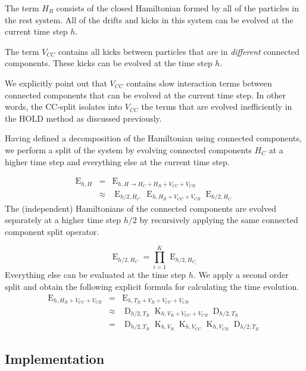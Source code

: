 \documentclass[referee]{aa}
\begin{document}
The term $H_{R}$ consists of the closed Hamiltonian formed by all
of the particles in the rest system. All of the drifts and kicks in
this system can be evolved at the current time step $h$. 

The term $V_{CC}$ contains all kicks between particles that are in
\emph{different} connected components. These kicks can be evolved
at the time step $h$.

We explicitly point out that $V_{CC}$ contains slow interaction terms
between connected components that can be evolved at the current time
step. In other words, the CC-split isolates into $V_{CC}$ the terms
that are evolved inefficiently in the HOLD method as discussed previously.

Having defined a decomposition of the Hamiltonian using connected
components, we perform a split of the system by evolving connected
components $H_{C}$ at a higher time step and everything else at the
current time step.

\begin{eqnarray*}
\operatorname{E}_{h,H} & = & \operatorname{E}_{h,H\rightarrow H_{C}+H_{R}+V_{CC}+V_{CR}}\\
 & \approx & \operatorname{E}_{h/2,H_{C}}\,\operatorname{E}_{h,H_{R}+V_{CC}+V_{CR}}\operatorname{E}_{h/2,H_{C}}
\end{eqnarray*}
The (independent) Hamiltonians of the connected components are evolved
separately at a higher time step $h/2$ by recursively applying the
same connected component split operator.

\[
\operatorname{E}_{h/2,H_{C}}=\overset{K}{\underset{i=1}{\prod}}\operatorname{E}_{h/2,H_{C_{i}}}
\]
Everything else can be evaluated at the time step $h$. We apply a
second order split and obtain the following explicit formula for calculating
the time evolution.
\begin{eqnarray*}
\operatorname{E}_{h,H_{R}+V_{CC}+V_{CR}} & = & \operatorname{E}_{h,T_{R}+V_{R}+V_{CC}+V_{CR}}\\
 & \approx & \operatorname{D}_{h/2,T_{R}}\operatorname{K}_{h,V_{R}+V_{CC}+V_{CR}}\operatorname{D}_{h/2,T_{R}}\\
 & = & \operatorname{D}_{h/2,T_{R}}\operatorname{K}_{h,V_{R}}\operatorname{K}_{h,V_{CC}}\operatorname{K}_{h,V_{CR}}\operatorname{D}_{h/2,T_{R}}
\end{eqnarray*}



\subsection{Implementation}
\end{document}
